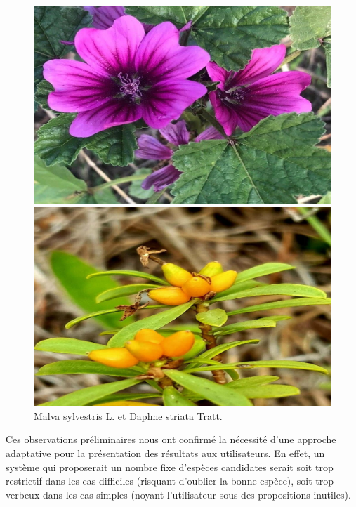 \documentclass[a4paper,12pt]{article}
\begin{document}
\begin{figure}[H]
    \centering
    \begin{minipage}{0.5\textwidth}
      \includegraphics[width=0.9\linewidth]{images/malva_sylvestris.jpeg}
    \end{minipage}%
    \begin{minipage}{0.5\textwidth}
      \includegraphics[width=0.9\linewidth]{images/daphne_striata.jpeg}
    \end{minipage}
    \caption{Malva sylvestris L. et Daphne striata Tratt.}
\end{figure}

Ces observations préliminaires nous ont confirmé la nécessité d'une approche adaptative pour la présentation des résultats aux utilisateurs. En effet, un système qui proposerait un nombre fixe d'espèces candidates serait soit trop restrictif dans les cas difficiles (risquant d'oublier la bonne espèce), soit trop verbeux dans les cas simples (noyant l'utilisateur sous des propositions inutiles).
\end{document}
